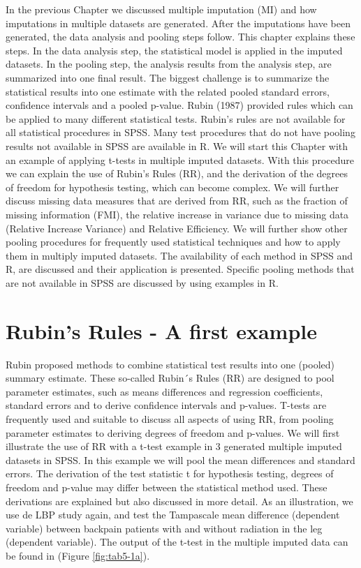 \documentclass[]{book}
\theoremstyle{definition}
\theoremstyle{definition}
\theoremstyle{definition}
\theoremstyle{remark}
\begin{document}
In the previous Chapter we discussed multiple imputation (MI) and how
imputations in multiple datasets are generated. After the imputations
have been generated, the data analysis and pooling steps follow. This
chapter explains these steps. In the data analysis step, the statistical
model is applied in the imputed datasets. In the pooling step, the
analysis results from the analysis step, are summarized into one final
result. The biggest challenge is to summarize the statistical results
into one estimate with the related pooled standard errors, confidence
intervals and a pooled p-value. Rubin (1987) provided rules which can be
applied to many different statistical tests. Rubin's rules are not
available for all statistical procedures in SPSS. Many test procedures
that do not have pooling results not available in SPSS are available in
R. We will start this Chapter with an example of applying t-tests in
multiple imputed datasets. With this procedure we can explain the use of
Rubin's Rules (RR), and the derivation of the degrees of freedom for
hypothesis testing, which can become complex. We will further discuss
missing data measures that are derived from RR, such as the fraction of
missing information (FMI), the relative increase in variance due to
missing data (Relative Increase Variance) and Relative Efficiency. We
will further show other pooling procedures for frequently used
statistical techniques and how to apply them in multiply imputed
datasets. The availability of each method in SPSS and R, are discussed
and their application is presented. Specific pooling methods that are
not available in SPSS are discussed by using examples in R.

\section{Rubin's Rules - A first
example}\label{rubins-rules---a-first-example}

Rubin proposed methods to combine statistical test results into one
(pooled) summary estimate. These so-called Rubin´s Rules (RR) are
designed to pool parameter estimates, such as means differences and
regression coefficients, standard errors and to derive confidence
intervals and p-values. T-tests are frequently used and suitable to
discuss all aspects of using RR, from pooling parameter estimates to
deriving degrees of freedom and p-values. We will first illustrate the
use of RR with a t-test example in 3 generated multiple imputed datasets
in SPSS. In this example we will pool the mean differences and standard
errors. The derivation of the test statistic t for hypothesis testing,
degrees of freedom and p-value may differ between the statistical method
used. These derivations are explained but also discussed in more detail.
As an illustration, we use de LBP study again, and test the Tampascale
mean difference (dependent variable) between backpain patients with and
without radiation in the leg (dependent variable). The output of the
t-test in the multiple imputed data can be found in (Figure
\ref{fig:tab5-1a}).
\end{document}
